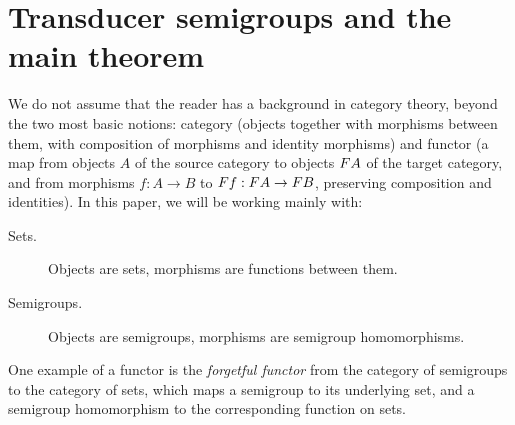 \section{Transducer semigroups and the main theorem}
We do not assume that the reader has a background in category theory, beyond the two most basic notions: category (objects together with morphisms between them, with composition of morphisms and identity morphisms) and functor (a map from objects $A$ of the source category to objects $\functor A$ of the target category, and from morphisms $f : A \to B$ to $\functor f : \functor A \to \functor B$, preserving composition and identities). In this paper, we will be working mainly with:
\begin{description}
    \item[Sets.] Objects are sets,  morphisms are functions between them.
    \item[Semigroups.] Objects are semigroups,  morphisms are semigroup homomorphisms.
\end{description}

One example of a functor is the \emph{forgetful functor} from the category of semigroups to the category of sets, which maps a semigroup to its underlying set, and a semigroup homomorphism to the corresponding function on sets. 

